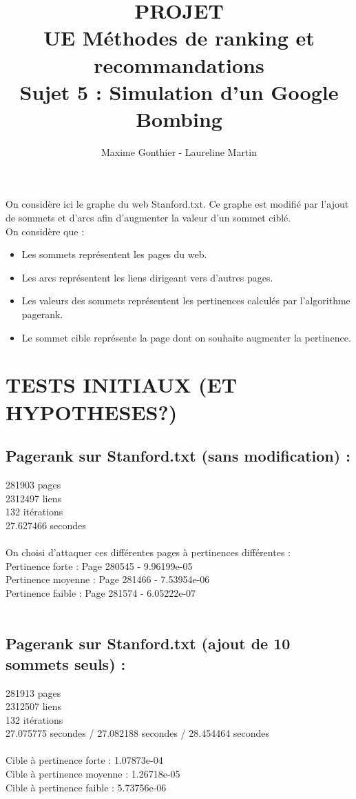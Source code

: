 \documentclass[a4paper,11pt]{article}
\title{PROJET\\ UE Méthodes de ranking et recommandations\\ 
		Sujet 5 : Simulation d'un Google Bombing}
\author{Maxime Gonthier - Laureline Martin}
\begin{document}
\clearpage
	\clearpage
	\maketitle
	\newpage\clearpage{}

\newpage
\tableofcontents

\newpage
On considère ici le graphe du web Stanford.txt. Ce graphe est modifié par l'ajout de sommets et d'arcs afin d'augmenter la valeur d'un sommet ciblé.\\
On considère que :\\
\begin{itemize}
	\item Les sommets représentent les pages du web.
	\item Les arcs représentent les liens dirigeant vers d'autres pages.
	\item Les valeurs des sommets représentent les pertinences calculés par l'algorithme pagerank.
	\item Le sommet cible représente la page dont on souhaite augmenter la pertinence.
\end{itemize}

\section{TESTS INITIAUX (ET HYPOTHESES?)}
	\subsection{Pagerank sur Stanford.txt (sans modification) :}
		281903 pages\\
		2312497 liens\\
		132 itérations\\
		27.627466 secondes\\
		\\
		On choisi d'attaquer ces différentes pages à pertinences différentes :\\
		Pertinence forte : Page 280545 - 9.96199e-05\\
		Pertinence moyenne : Page 281466 - 7.53954e-06\\
		Pertinence faible : Page 281574 - 6.05222e-07\\
		\\
	\subsection{Pagerank sur Stanford.txt (ajout de 10 sommets seuls) :}
		281913 pages\\
		2312507 liens\\
		132 itérations\\
		27.075775 secondes / 27.082188 secondes / 28.454464 secondes\\
		\\
		Cible à pertinence forte : 1.07873e-04\\
		Cible à pertinence moyenne : 1.26718e-05\\
		Cible à pertinence faible : 5.73756e-06\\
		\\
\end{document}
